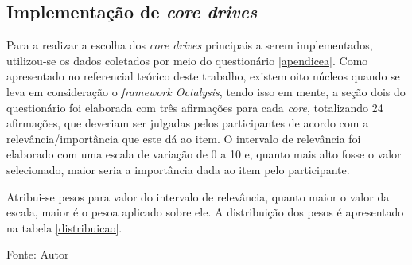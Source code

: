 \subsection{Implementação de \textit{core drives}}


Para a realizar a escolha dos \textit{core drives} principais a serem implementados, utilizou-se os dados coletados por meio do questionário
\ref{apendicea}. Como apresentado no referencial teórico deste trabalho, existem oito núcleos quando se leva em consideração o \textit{framework Octalysis},
tendo isso em mente, a seção dois do questionário foi elaborada com três afirmações para cada \textit{core}, totalizando 24 afirmações, que deveriam ser julgadas
pelos participantes de acordo com a relevância/importância que este dá ao item. O intervalo de relevância foi elaborado com uma escala de variação de 0 a 10 e, quanto mais alto
fosse o valor selecionado, maior seria a importância dada ao item pelo participante.

Atribui-se pesos para valor do intervalo de relevância, quanto maior o valor da escala, maior é o pesoa aplicado sobre ele. A distribuição dos pesos
é apresentado na tabela \ref{distribuicao}.

\begin{table}[h]
	\centering
	\caption{Distribuição dos pesos na escala}
	\label{distribuicao}
	Fonte: Autor
\end{table}

